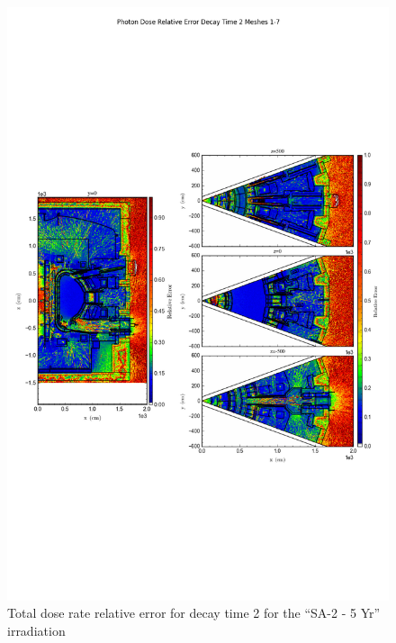 \documentclass[12pt]{article}
\begin{document}
\begin{figure}[ht!]
\centering
\includegraphics[trim={0cm 8cm, 0cm 8cm},clip,scale=0.75]{../plots/final_model_with_b4c/10year/Photon_Dose_Relative_Error_Decay_Time_2_Meshes_1-7.png}
\caption{Total dose rate relative error for decay time 2 for the ``SA-2 - 5 Yr'' irradiation}
\label{fig:photons_10y_dc2_b4c_relerr}
\end{figure}
\end{document}
